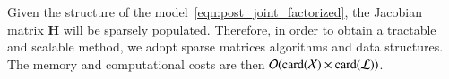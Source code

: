 Given the structure of the model~\eqref{eqn:post_joint_factorized}, the
Jacobian matrix $\mathbf{H}$ will be sparsely populated. Therefore, in order to
obtain a tractable and scalable method, we adopt sparse matrices algorithms and
data structures. The memory and computational costs are then
$\mathcal{O}(\operatorname{card}(\mathcal{X})\times\operatorname{card}(\mathcal{L}))$.
